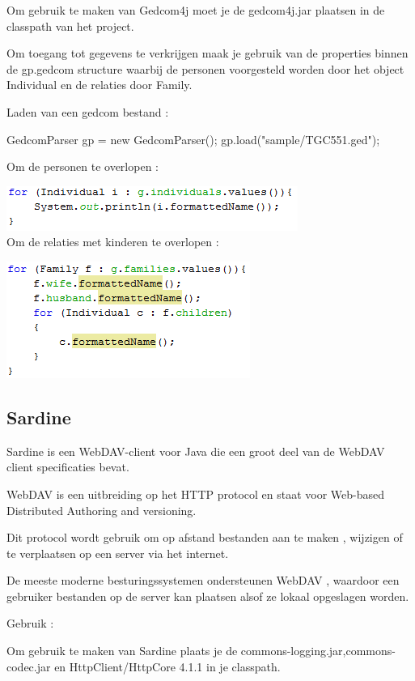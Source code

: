 \documentclass[pdftex,a4paper,12pt,twoside]{report}
\begin{document}
Om gebruik te maken van Gedcom4j moet je de gedcom4j.jar plaatsen in de classpath van het project.

Om toegang tot gegevens te verkrijgen maak je gebruik van de properties binnen de gp.gedcom structure waarbij de personen voorgesteld worden door het object Individual en de relaties door Family.

Laden van een gedcom bestand :

GedcomParser gp = new GedcomParser();
gp.load("sample/TGC551.ged");

Om de personen te overlopen  :

\includegraphics{images/gedcomindividual.png}\\

Om de relaties met kinderen te overlopen :

\includegraphics{images/gedcomfamily.png}\\

\subsection{Sardine}

Sardine is een WebDAV-client voor Java die een groot deel van de WebDAV client specificaties bevat. 

WebDAV is een uitbreiding op het HTTP protocol en staat voor Web-based Distributed Authoring and versioning.

Dit protocol wordt gebruik om op afstand bestanden aan te maken , wijzigen of te verplaatsen op een server via het internet.

De meeste moderne besturingssystemen ondersteunen WebDAV , waardoor een gebruiker bestanden op de server kan plaatsen alsof ze lokaal opgeslagen worden.

Gebruik :

Om gebruik te maken van Sardine plaats je de commons-logging.jar,commons-codec.jar en HttpClient/HttpCore 4.1.1 in je classpath.
\end{document}
